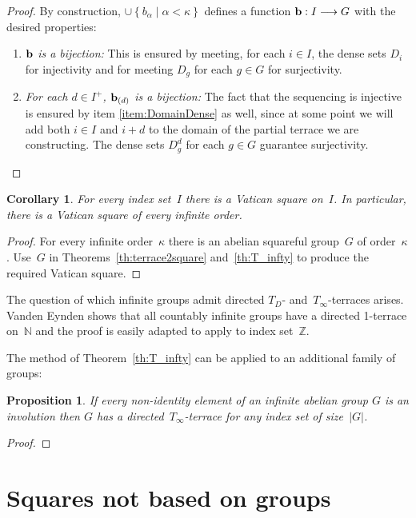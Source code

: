 \documentclass[12pt,a4paper]{article}
\newtheorem{cor}[thm]{Corollary}
\newtheorem{prop}[thm]{Proposition}
\newcommand{\Z}{\mathbb{Z}}
\newcommand{\N}{\mathbb{N}}
\newcommand{\To}{\longrightarrow}
\newcommand{\st}{\; | \;}
\newcommand{\set}[2]{\left\{#1\st #2 \right\}}
\renewcommand{\b}{\textup{\textbf{b}}}
\begin{document}
\begin{proof}
By construction, $\cup \set{b_\alpha}{\alpha<\kappa}$ defines a function $\b: I \To G$ with the desired properties: 

\begin{enumerate}
	\item \emph{$\b$ is a bijection:} This is ensured by meeting, for each $i \in I$, the dense sets $D_i$ for injectivity and for meeting $D_g$ for each $g \in G$ for surjectivity.
	\item \emph{For each $d \in I^+$, $\b_{(d)}$ is a bijection:} The fact that the sequencing is injective is ensured by item \ref{item:DomainDense} as well, since at some point we will add both $i \in I$ and $i+d$ to the domain of the partial terrace we are constructing. The dense sets $D^d_g$ for each $g \in G$ guarantee surjectivity. \qedhere
\end{enumerate}
\end{proof}


\begin{cor}\label{cor:vatsquares}
For every index set~$I$ there is a Vatican square on~$I$.  In particular, there is a Vatican square of every infinite order.
\end{cor}

\begin{proof}
For every infinite order~$\kappa$ there is an abelian squareful group~$G$ of order~$\kappa$. Use~$G$ in Theorems~\ref{th:terrace2square} and~\ref{th:T_infty} to produce the required Vatican square.
\end{proof}

The question of which infinite groups admit directed $T_D$- and~$T_{\infty}$-terraces arises.  Vanden Eynden shows that all countably infinite groups have a directed 1-terrace on~$\N$ \cite{VE78} and the proof is easily adapted to apply to index set~$\Z$.  

The method of Theorem~\ref{th:T_infty} can be applied to an additional family of groups:

\begin{prop}\label{prop:allinv}
If every non-identity element of an infinite abelian group $G$ is an involution then $G$ has a directed~$T_{\infty}$-terrace for any index set of size~$|G|$. 
\end{prop}

\begin{proof}
\end{proof}



\section{Squares not based on groups}\label{sec:notgp}
\end{document}
